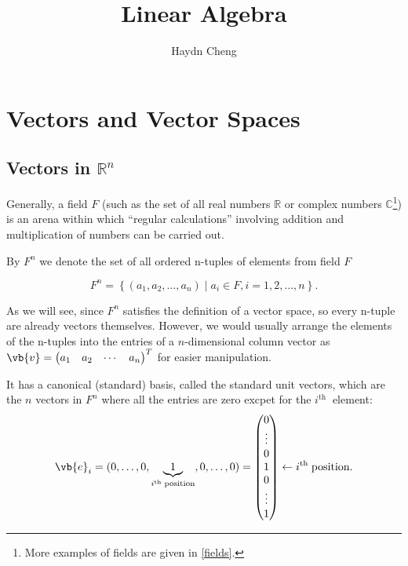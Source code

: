 \documentclass[a4paper,12pt]{report}
\title{Linear Algebra}
\author{Haydn Cheng}
\date{}
\begin{document}
\maketitle
\tableofcontents


\chapter{Vectors and Vector Spaces}

\section{Vectors in \(\mathbb{R}^{n}  \) }

Generally, a field \(F\)  (such as the set of all real numbers \(\mathbb{R}\) or complex numbers \(\mathbb{C}\)\footnote{More examples of fields are given in \cref{fields}.}) is an arena within which ``regular calculations'' involving addition and multiplication of numbers can be carried out. 

By \(F^{n} \) we denote the set of all ordered n-tuples of elements from field \(F\)

\begin{equation}
    F^{n} = \left\{ (a_1 , a_2 ,\ldots ,a_{n} ) \mid a_{i} \in F, i = 1,2,\ldots ,n  \right\}.
\end{equation}

As we will see, since \(F^{n} \) satisfies the definition of a vector space, so every n-tuple are already vectors themselves. However, we would usually arrange the elements of the n-tuples into the entries of a \(n\)-dimensional column vector as \(\vb{v} = \begin{pmatrix}
    a_1  & a_2  & \cdots  & a_{n}   \\
\end{pmatrix}^T\) for easier manipulation. 

It has a canonical (standard) basis, called the standard unit vectors, which are the \(n\) vectors in \(F^{n} \) where all the entries are zero excpet for the \(i^{\text{th }} \) element:  
\begin{equation}
    \vb{e} _{i} = (0,\ldots ,0,\underbrace{1}_{i^{\text{th }} \text{position} }, 0, \ldots , 0) = \begin{pmatrix}
         0 \\
         \vdots  \\
         0 \\
         1 \\
         0 \\
         \vdots  \\
         1 \\
    \end{pmatrix} \leftarrow i^{\text{th }} \text{position}.
\end{equation}
\end{document}
